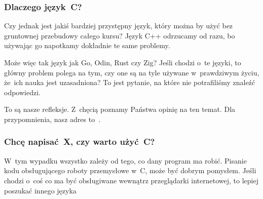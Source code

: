 \documentclass[10pt,t]{beamer}
\begin{document}
\begin{frame}
  \frametitle{Dlaczego język~C?}


  Czy jednak jest jakiś bardziej przystępny język, który można by użyć
  bez gruntownej przebudowy całego kursu? Język C++ odrzucamy od razu,
  bo używając go napotkamy dokładnie te same problemy.

  Może więc tak język jak Go, Odin, Rust czy Zig? Jeśli chodzi o~te
  języki, to główny problem polega na tym, czy one są na tyle używane
  w~prawdziwym życiu, że~ich nauka jest uzasadniona? To jest pytanie,
  na które nie potrafiliśmy znaleźć odpowiedzi.

  To są nasze refleksje. Z~chęcią poznamy Państwa opinię na ten temat.
  Dla przypomnienia, nasz adres to~\email.





\end{frame}





\begin{frame}
  \frametitle{Chcę napisać~X, czy warto użyć~C?}


  W~tym wypadku wszystko zależy od tego, co dany program ma robić. Pisanie
  kodu obsługującego roboty przemysłowe w~C, może być dobrym pomysłem. Jeśli
  chodzi o~coś co ma być obsługiwane wewnątrz przeglądarki internetowej,
  to lepiej poszukać innego języka

\end{frame}
\end{document}
